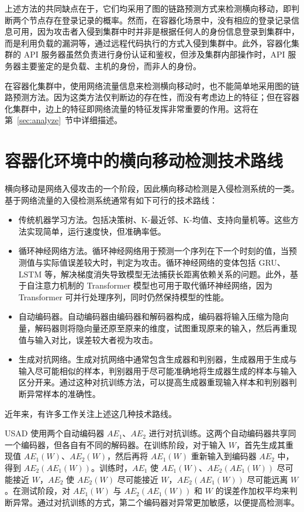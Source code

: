 {上述方法的共同缺点在于，它们均采用了图的链路预测方式来检测横向移动，即判断两个节点存在登录记录的概率。然而，在容器化场景中，没有相应的登录记录信息可用，因为攻击者入侵到集群中时并非是根据任何人的身份信息登录到集群中，而是利用负载的漏洞等，通过远程代码执行的方式入侵到集群中。此外，容器化集群的 API 服务器虽然负责进行身份认证和鉴权，但涉及集群内部操作时，API 服务器主要鉴定的是负载、主机的身份，而非人的身份。

在容器化集群中，使用网络流量信息来检测横向移动时，也不能简单地采用图的链路预测方法。因为这类方法仅判断边的存在性，而没有考虑边上的特征；但在容器化集群中，边上的特征即网络流量的特征发挥非常重要的作用。这将在第~\ref{sec:analyze}~节中详细描述。

\section{容器化环境中的横向移动检测技术路线}

横向移动是网络入侵攻击的一个阶段，因此横向移动检测是入侵检测系统的一类。基于网络流量的入侵检测系统通常有如下可行的技术路线\citep{ahmad2021network, darban2022deep}：

\begin{itemize}
    \item 传统机器学习方法。包括决策树、K-最近邻、K-均值、支持向量机等。这些方法实现简单，运行速度快，但准确率低。
    \item 循环神经网络方法。循环神经网络用于预测一个序列在下一个时刻的值，当预测值与实际值误差较大时，判定为攻击。循环神经网络的变体包括 GRU、LSTM 等，解决梯度消失导致模型无法捕获长距离依赖关系的问题。此外，基于自注意力机制的 Transformer\citep{vaswani2017attention} 模型也可用于取代循环神经网络，因为 Transformer 可并行处理序列，同时仍然保持模型的性能。
    \item 自动编码器。自动编码器由编码器和解码器构成，编码器将输入压缩为隐向量，解码器则将隐向量还原至原来的维度，试图重现原来的输入，然后再重现值与输入对比，误差较大者视为攻击。
    \item 生成对抗网络。生成对抗网络中通常包含生成器和判别器，生成器用于生成与输入尽可能相似的样本，判别器用于尽可能准确地将生成器生成的样本与输入区分开来。通过这种对抗训练方法，可以提高生成器重现输入样本和判别器判断异常样本的准确性。
\end{itemize}

近年来，有许多工作关注上述这几种技术路线。

USAD\citep{audibert2020usad} 使用两个自动编码器 $AE_{1}$、$AE_{2}$ 进行对抗训练。这两个自动编码器共享同一个编码器，但各自有不同的解码器。在训练阶段，对于输入 $W$，首先生成其重现值 $AE_{1}(W)$、$AE_{2}(W)$，然后再将 $AE_{1}(W)$ 重新输入到编码器 $AE_{2}$ 中，得到 $AE_{2}(AE_{1}(W))$。训练时，$AE_{1}$ 使 $AE_{1}(W)$、$AE_{2}(AE_{1}(W))$ 尽可能接近 $W$，$AE_{2}$ 使 $AE_{2}(W)$ 尽可能接近 $W$，$AE_{2}(AE_{1}(W))$ 尽可能远离 $W$。在测试阶段，对 $AE_{1}(W)$ 与 $AE_{2}(AE_{1}(W))$ 和 $W$ 的误差作加权平均来判断异常。通过对抗训练的方式，第二个编码器对异常更加敏感，以便提高检测率。

}
